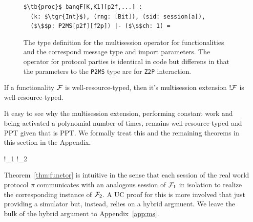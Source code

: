 %
\begin{figure}
\begin{lstlisting}[basicstyle=\footnotesize\BeraMonottFamily, frame=single, mathescape]
$\tb{proc}$ bangF[K,K1][p2f,...] :
  (k: $\tgr{Int}$), (rng: [Bit]), (sid: session[a]), 
  ($\$$p: P2MS[p2f][f2p]) |- ($\$$ch: 1) =
\end{lstlisting}
\caption{The type definition for the multisession operator for functionalities and the correspond message type and import parameters. The operator for protocol parties is identical in code but differens in that the parameters to the \texttt{P2MS} type are for \texttt{Z2P} interaction.}
\label{lst:bangf}
\end{figure}

\begin{theorem}[PPT !]\label{thm:bangppt}
If a functionality $\mathcal{F}$ is well-resource-typed, then it's multisession extension $!\mathcal{F}$ is well-resource-typed.
\end{theorem}

It easy to see why the multisession extension, performing constant work and being activated a polynomial number of times, remains well-resource-typed and PPT given that \F is PPT.
We formally treat this and the remaining theorems in this section in the Appendix.

\begin{theorem}\label{thm:functor}
	\begin{mathpar}
		{
			!\F_1 \xrightarrow{!\pi} !\F_2
		}
	\end{mathpar}
\end{theorem}
Theorem~\ref{thm:functor} is intuitive in the sense that each session of the real world protocol $\pi$ communicates with an analogous session of $\mathcal{F}_1$ in isolation to realize the corresponding instance of $\mathcal{F}_2$. 
A UC proof for this is more involved that just providing a simulator but, instead, relies on a hybrid argmuent. 
We leave the bulk of the hybrid argument to Appendix~\ref{app:ms}.

